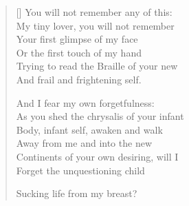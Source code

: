 \label{ch:forelena}
\settowidth{\versewidth}{As you shed the chrysalis of your infant}
\begin{verse}[\versewidth]
You will not remember any of this:\\
My tiny lover, you will not remember\\
Your first glimpse of my face\\
Or the first touch of my hand\\
Trying to read the Braille of your new\\
And frail and frightening self.

And I fear my own forgetfulness:\\
As you shed the chrysalis of your infant\\
Body, infant self, awaken and walk\\
Away from me and into the new\\
Continents of your own desiring, will I\\
Forget the unquestioning child

Sucking life from my breast?
\end{verse}
